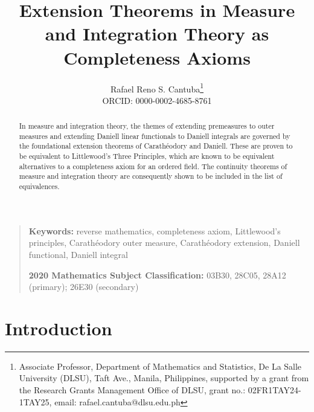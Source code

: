 \documentclass[11pt,a4paper]{article}
\title{Extension Theorems in Measure and Integration Theory as Completeness Axioms}
\author{Rafael Reno S. Cantuba\thanks{Associate Professor, Department of Mathematics and Statistics, De La Salle University (DLSU), Taft Ave., Manila, Philippines, supported by a grant from the Research Grants Management Office of DLSU, grant no.: 02FR1TAY24-1TAY25, email: rafael.cantuba@dlsu.edu.ph}\\ ORCID: 0000-0002-4685-8761\orcidlink{0000-0002-4685-8761}}
\date{}
\begin{document}
\maketitle

\begin{abstract}
In measure and integration theory, the themes of extending premeasures to outer measures and extending Daniell linear functionals to Daniell integrals are governed by the foundational extension theorems of Carath\'{e}odory and Daniell. These are proven to be equivalent to Littlewood's Three Principles, which are known to be equivalent alternatives to a completeness axiom for an ordered field. The continuity theorems of measure and integration theory are consequently shown to be included in the list of equivalences.
\end{abstract}

\vspace{0.5em}
\noindent
\begin{quote}
    \small
\textbf{Keywords:} reverse mathematics, completeness axiom, Littlewood's principles, Carathéodory outer measure, Carathéodory extension, Daniell functional, Daniell integral

\vspace{0.5em}
\textbf{2020 Mathematics Subject Classification:} 03B30, 28C05, 28A12 (primary); 26E30 (secondary)
\end{quote}

\section{Introduction}
\end{document}
